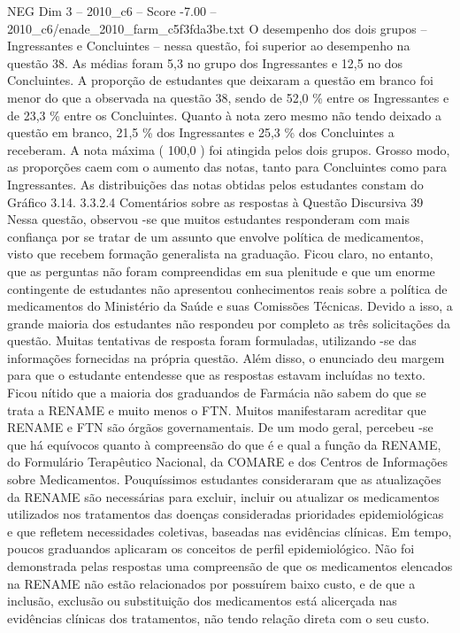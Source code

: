 \begin{textsample}{NEG Dim 3 – 2010\_c6 – Score -7.00 – 2010\_c6/enade\_2010\_farm\_c5f3fda3be.txt}
O desempenho dos dois grupos – Ingressantes e Concluintes – nessa questão, foi superior ao desempenho na questão 38.
As médias foram 5,3 no grupo dos Ingressantes e 12,5 no dos Concluintes.
A proporção de estudantes que deixaram a questão em branco foi menor do que a observada na questão 38, sendo de 52,0 \% entre os Ingressantes e de 23,3 \% entre os Concluintes.
Quanto à nota zero mesmo não tendo deixado a questão em branco, 21,5 \% dos Ingressantes e 25,3 \% dos Concluintes a receberam.
A nota máxima ( 100,0 ) foi atingida pelos dois grupos.
Grosso modo, as proporções caem com o aumento das notas, tanto para Concluintes como para Ingressantes.
As distribuições das notas obtidas pelos estudantes constam do Gráfico 3.14. 3.3.2.4 Comentários sobre as respostas à Questão Discursiva 39 Nessa questão, observou -se que muitos estudantes responderam com mais confiança por se tratar de um assunto que envolve política de medicamentos, visto que recebem formação generalista na graduação.
Ficou claro, no entanto, que as perguntas não foram compreendidas em sua plenitude e que um enorme contingente de estudantes não apresentou conhecimentos reais sobre a política de medicamentos do Ministério da Saúde e suas Comissões Técnicas.
Devido a isso, a grande maioria dos estudantes não respondeu por completo as três solicitações da questão.
Muitas tentativas de resposta foram formuladas, utilizando -se das informações fornecidas na própria questão.
Além disso, o enunciado deu margem para que o estudante entendesse que as respostas estavam incluídas no texto.
Ficou nítido que a maioria dos graduandos de Farmácia não sabem do que se trata a RENAME e muito menos o FTN.
Muitos manifestaram acreditar que RENAME e FTN são órgãos governamentais.
De um modo geral, percebeu -se que há equívocos quanto à compreensão do que é e qual a função da RENAME, do Formulário Terapêutico Nacional, da COMARE e dos Centros de Informações sobre Medicamentos.
Pouquíssimos estudantes consideraram que as atualizações da RENAME são necessárias para excluir, incluir ou atualizar os medicamentos utilizados nos tratamentos das doenças consideradas prioridades epidemiológicas e que refletem necessidades coletivas, baseadas nas evidências clínicas.
Em tempo, poucos graduandos aplicaram os conceitos de perfil epidemiológico.
Não foi demonstrada pelas respostas uma compreensão de que os medicamentos elencados na RENAME não estão relacionados por possuírem baixo custo, e de que a inclusão, exclusão ou substituição dos medicamentos está alicerçada nas evidências clínicas dos tratamentos, não tendo relação direta com o seu custo.

\end{textsample}
